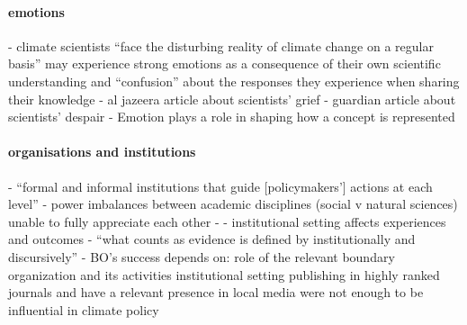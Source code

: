 \paragraph{emotions}
\cite{RandallH2019} - climate scientists ``face the disturbing reality of climate change on a regular basis'' may experience strong emotions as a consequence of their own scientific understanding and ``confusion'' about the responses they experience when sharing their knowledge
\cite{Pivovarchuk2024} - al jazeera article about scientists' grief
\cite{Carrington2024} - guardian article about scientists' despair
\cite{Makin2024} - Emotion plays a role in shaping how a concept is represented
\paragraph{organisations and institutions}
\cite{CairneyW2017} - ``formal and informal institutions that guide [policymakers'] actions at each level''
\cite{BalvaneraJNOBCDGGKKMPSSW2020} - power imbalances between academic disciplines (social v natural sciences) unable to fully appreciate each other
\cite{GeuijenMCRv2017} - 
\cite{SaxonbergSL2023} - institutional setting affects experiences and outcomes
\cite{StrassheimK2014} - ``what counts as evidence is defined by institutionally and discursively''
\cite{WesselinkH2020} - BO's success depends on: role of the relevant boundary organization and its activities
institutional setting \cite{WeyrauchES2016,OjanenBKP2021,SaxonbergSL2023}
\cite{IbarraJOBCIMRS2022} publishing in highly ranked journals and have a relevant presence in local media were not enough to be influential in climate policy
\fi